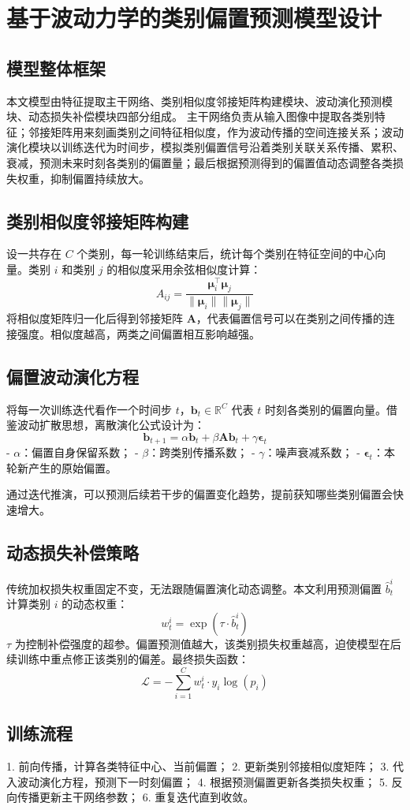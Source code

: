 \section{基于波动力学的类别偏置预测模型设计}
\subsection{模型整体框架}
本文模型由特征提取主干网络、类别相似度邻接矩阵构建模块、波动演化预测模块、动态损失补偿模块四部分组成。
主干网络负责从输入图像中提取各类别特征；邻接矩阵用来刻画类别之间特征相似度，作为波动传播的空间连接关系；波动演化模块以训练迭代为时间步，模拟类别偏置信号沿着类别关联关系传播、累积、衰减，预测未来时刻各类别的偏置量；最后根据预测得到的偏置值动态调整各类损失权重，抑制偏置持续放大。

\subsection{类别相似度邻接矩阵构建}
设一共存在 $C$ 个类别，每一轮训练结束后，统计每个类别在特征空间的中心向量。类别 $i$ 和类别 $j$ 的相似度采用余弦相似度计算：
\[
A_{ij}=\frac{\boldsymbol{\mu}_i^\top \boldsymbol{\mu}_j}{\|\boldsymbol{\mu}_i\|\|\boldsymbol{\mu}_j\|}
\]
将相似度矩阵归一化后得到邻接矩阵 $\boldsymbol{A}$，代表偏置信号可以在类别之间传播的连接强度。相似度越高，两类之间偏置相互影响越强。

\subsection{偏置波动演化方程}
将每一次训练迭代看作一个时间步 $t$，$\boldsymbol{b}_t\in\mathbb{R}^C$ 代表 $t$ 时刻各类别的偏置向量。借鉴波动扩散思想，离散演化公式设计为：
\[
\boldsymbol{b}_{t+1} = \alpha \boldsymbol{b}_t + \beta \boldsymbol{A}\boldsymbol{b}_t + \gamma \boldsymbol{\epsilon}_t
\]
- $\alpha$：偏置自身保留系数；
- $\beta$：跨类别传播系数；
- $\gamma$：噪声衰减系数；
- $\boldsymbol{\epsilon}_t$：本轮新产生的原始偏置。

通过迭代推演，可以预测后续若干步的偏置变化趋势，提前获知哪些类别偏置会快速增大。

\subsection{动态损失补偿策略}
传统加权损失权重固定不变，无法跟随偏置演化动态调整。本文利用预测偏置 $\hat{b}_t^i$ 计算类别 $i$ 的动态权重：
\[
w_t^i = \exp(\tau\cdot \hat{b}_t^i)
\]
$\tau$ 为控制补偿强度的超参。偏置预测值越大，该类别损失权重越高，迫使模型在后续训练中重点修正该类别的偏差。最终损失函数：
\[
\mathcal{L}=-\sum_{i=1}^C w_t^i \cdot y_i \log(p_i)
\]

\subsection{训练流程}
1. 前向传播，计算各类特征中心、当前偏置；
2. 更新类别邻接相似度矩阵；
3. 代入波动演化方程，预测下一时刻偏置；
4. 根据预测偏置更新各类损失权重；
5. 反向传播更新主干网络参数；
6. 重复迭代直到收敛。

